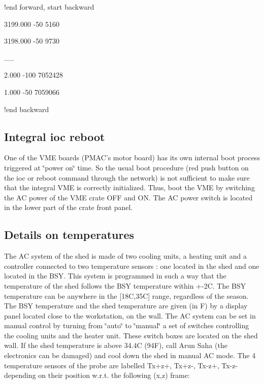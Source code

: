 !end forward, start backward 

3199.000 -50 5160 

3198.000 -50 9730 

..... 

2.000 -100 7052428 

1.000 -50 7059066 

!end backward


\subsection{Integral ioc reboot }

One of the VME boards (PMAC's motor board) has its own internal boot process
triggered at \char`\"{}power on\char`\"{} time. So the usual boot procedure
(red push button on the ioc or reboot command through the network) is not sufficient
to make sure that the integral VME is correctly initialized. Thus, boot the
VME by switching the AC power of the VME crate OFF and ON. The AC power switch
is located in the lower part of the crate front panel. 


\subsection{Details on temperatures }

The AC system of the shed is made of two cooling units, a heating unit and a
controller connected to two temperature sensors : one located in the shed and
one located in the BSY. This system is programmed in such a way that the temperature
of the shed follows the BSY temperature within +-2C. The BSY temperature can
be anywhere in the {[}18C,35C{]} range, regardless of the season. The BSY temperature
and the shed temperature are given (in F) by a display panel located close to
the workstation, on the wall. The AC system can be set in manual control by
turning from \char`\"{}auto\char`\"{} to \char`\"{}manual\char`\"{} a set of
switches controlling the cooling units and the heater unit. These switch boxes
are located on the shed wall. If the shed temperature is above 34.4C (94F),
call Arun Saha (the electronics can be damaged) and cool down the shed in manual
AC mode. The 4 temperature sensors of the probe are labelled Tx+z+, Tx+z-, Tx-z+,
Tx-z- depending on their position w.r.t. the following (x,z) frame: 

